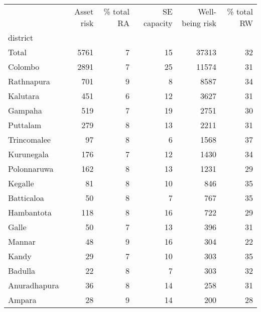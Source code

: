 \begin{tabular}{lrrrrr}
\toprule
{} &  Asset risk &  \% total RA &  SE capacity &  Well-being risk &  \% total RW \\
district     &             &             &              &                  &             \\
\midrule
Total        &        5761 &           7 &           15 &            37313 &          32 \\
Colombo      &        2891 &           7 &           25 &            11574 &          31 \\
Rathnapura   &         701 &           9 &            8 &             8587 &          34 \\
Kalutara     &         451 &           6 &           12 &             3627 &          31 \\
Gampaha      &         519 &           7 &           19 &             2751 &          30 \\
Puttalam     &         279 &           8 &           13 &             2211 &          31 \\
Trincomalee  &          97 &           8 &            6 &             1568 &          37 \\
Kurunegala   &         176 &           7 &           12 &             1430 &          34 \\
Polonnaruwa  &         162 &           8 &           13 &             1231 &          29 \\
Kegalle      &          81 &           8 &           10 &              846 &          35 \\
Batticaloa   &          50 &           8 &            7 &              767 &          35 \\
Hambantota   &         118 &           8 &           16 &              722 &          29 \\
Galle        &          50 &           7 &           13 &              396 &          31 \\
Mannar       &          48 &           9 &           16 &              304 &          22 \\
Kandy        &          29 &           7 &           10 &              303 &          35 \\
Badulla      &          22 &           8 &            7 &              303 &          32 \\
Anuradhapura &          36 &           8 &           14 &              258 &          31 \\
Ampara       &          28 &           9 &           14 &              200 &          28 \\

\end{tabular}
